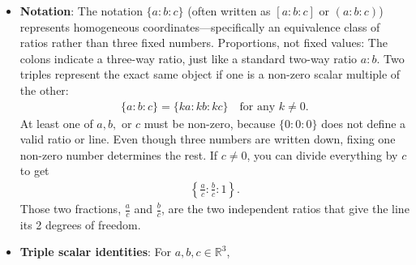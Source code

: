 \documentclass{report}
\begin{document}
\begin{itemize}
\begin{itemize}
                \item \textbf{Homogeneous view:} In \(\mathbb{P}^{2}\), a point is written with three homogeneous coordinates \((X, Y, W)\), not all zero.
                \item \textbf{Removing scale:} Multiplying all three coordinates by any non-zero scalar \(k\) gives the same point: \((kX, kY, kW)\) represents the same projective point as \((X, Y, W)\).
            \end{itemize}
            3 coordinates, 1 scale factor, so 2 degrees of freedom
            \bigbreak \noindent 
            A line in 2D is given by \(aX + bY + cW = 0\) (or \(ax + by + c = 0\) in inhomogeneous form), represented by the homogeneous line vector \(\mathbf{\ell} = (a, b, c)^T\).
            \bigbreak \noindent 
            Scaling \((a, b, c)\) by any non-zero constant \(k\) scales the entire equation by \(k\), leaving the solution set (the line itself) unchanged. Only the ratios \(\{a : b : c\}\) matter.
            \bigbreak {} coefficients, 1 overall scale, so 2 degrees of freedom.
        \item \textbf{Notation}: The notation \(\{a : b : c\}\) (often written as \([a : b : c]\) or \((a : b : c)\)) represents homogeneous coordinates—specifically an equivalence class of ratios rather than three fixed numbers. Proportions, not fixed values: The colons indicate a three-way ratio, just like a standard two-way ratio \(a : b\).
            \bigbreak \noindent 
            Two triples represent the exact same object if one is a non-zero scalar multiple of the other:
            \begin{align*}
                \{a:b:c\}=\{ka:kb:kc\}\quad \text{for\ any\ }k\ne 0
            .\end{align*}
            At least one of \(a, b,\) or \(c\) must be non-zero, because \(\{0 : 0 : 0\}\) does not define a valid ratio or line.
            \bigbreak \noindent 
            Even though three numbers are written down, fixing one non-zero number determines the rest.
            \bigbreak \noindent 
            If \(c \neq 0\), you can divide everything by \(c\) to get 
            \begin{align*}
                \left\{\frac{a}{c} : \frac{b}{c} : 1\right\}
            .\end{align*}
            Those two fractions, \(\frac{a}{c}\) and \(\frac{b}{c}\), are the two independent ratios that give the line its 2 degrees of freedom.
        \item \textbf{Triple scalar identities}: For $a,b,c \in \mathbb{R}^{3}$,

\end{itemize}
\end{document}
